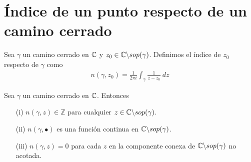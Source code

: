 \section{Índice de un punto respecto de un camino cerrado}

\begin{defi}
    Sea $\gamma$ un camino cerrado en $\mathbb{C}$ y $z_0 \in \mathbb{C} \backslash sop(\gamma)$. Definimos el índice de $z_0$ respecto de $\gamma$ como
    \begin{align*}
        n(\gamma,z_0) = \frac{1}{2\pi i}\int_{\gamma}{\frac{1}{z-z_0} \ dz}
    \end{align*}
\end{defi}

\begin{teo}
    Sea $\gamma$ un camino cerrado en $\mathbb{C}$. Entonces
    \begin{enumerate}
        \item[(i)] $n(\gamma,z) \in \mathbb{Z}$ para cualquier $z \in \mathbb{C} \backslash sop(\gamma)$.
        \item[(ii)] $n(\gamma, \bullet)$ es una función continua en $\mathbb{C} \backslash sop(\gamma)$.
        \item[(iii)] $n(\gamma,z) = 0$ para cada $z$ en la componente conexa de $\mathbb{C} \backslash sop(\gamma)$ no acotada.
    \end{enumerate}
\end{teo}

